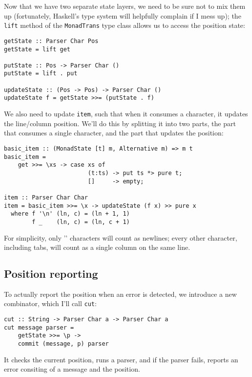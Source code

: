 \documentclass{tmr}
\newcommand{\Matt}[1]{\Red{Matt: #1}}
\begin{document}
Now that we have two separate state layers, we need to be sure not to mix them 
up (fortunately, Haskell's type system will helpfully complain if I mess up);
the \verb+lift+ method of the \verb+MonadTrans+ type class allows us to access
the position state:
\begin{verbatim}
getState :: Parser Char Pos
getState = lift get

putState :: Pos -> Parser Char ()
putState = lift . put

updateState :: (Pos -> Pos) -> Parser Char ()
updateState f = getState >>= (putState . f)
\end{verbatim}

We also need to update \verb+item+, such that when it consumes a character, 
it updates the line/column position.  We'll do this by splitting it into two
parts, the part that consumes a single character, and the part that updates the
position:
\begin{verbatim}
basic_item :: (MonadState [t] m, Alternative m) => m t
basic_item =
    get >>= \xs -> case xs of
                        (t:ts) -> put ts *> pure t;
                        []     -> empty;

item :: Parser Char Char
item = basic_item >>= \x -> updateState (f x) >> pure x
  where f '\n' (ln, c) = (ln + 1, 1)
        f _    (ln, c) = (ln, c + 1)
\end{verbatim}

For simplicity, only '\n' characters will count as newlines; every other character,
including tabs, will count as a single column on the same line.


\subsection{Position reporting}
To actually report the position when an error is detected, we introduce a new 
combinator, which I'll call \verb+cut+:
\Matt{a horrible name}
\begin{verbatim}
cut :: String -> Parser Char a -> Parser Char a
cut message parser = 
    getState >>= \p ->
    commit (message, p) parser
\end{verbatim}

It checks the current position, runs a parser, and if the parser fails, reports
an error consiting of a message and the position.
\end{document}

